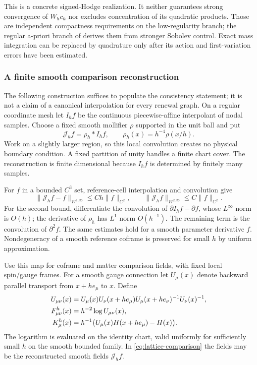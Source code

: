 \documentclass[11pt]{article}
\numberwithin{equation}{section}
\theoremstyle{definition}
\theoremstyle{remark}
\newcommand{\norm}[1]{\lVert#1\rVert}
\begin{document}
This is a concrete signed-Hodge realization. It neither guarantees strong convergence of $W_hc_h$ nor excludes concentration of its quadratic products. Those are independent compactness requirements on the low-regularity branch; the regular a-priori branch of  derives them from stronger Sobolev control. Exact mass integration can be replaced by quadrature only after its action and first-variation errors have been estimated.

\subsubsection{A finite smooth comparison reconstruction}

The following construction suffices to populate the consistency statement; it is not a claim of a canonical interpolation for every renewal graph. On a regular coordinate mesh let $I_hf$ be the continuous piecewise-affine interpolant of nodal samples. Choose a fixed smooth mollifier $\rho$ supported in the unit ball and put
\begin{equation}
 \mathcal J_hf=\rho_h*I_hf,
 \qquad \rho_h(x)=h^{-4}\rho(x/h).
 \label{eq:smooth-reconstruction}
\end{equation}
Work on a slightly larger region, so this local convolution creates no physical boundary condition. A fixed partition of unity handles a finite chart cover. The reconstruction is finite dimensional because $I_hf$ is determined by finitely many samples.

For $f$ in a bounded $C^3$ set, reference-cell interpolation and convolution give
\begin{equation}
 \norm{\mathcal J_hf-f}_{W^{1,\infty}}\le Ch\norm f_{C^2},
 \qquad \norm{\mathcal J_hf}_{W^{2,\infty}}\le C\norm f_{C^2}.
 \label{eq:smooth-reconstruction-estimate}
\end{equation}
For the second bound, differentiate the convolution of $\partial I_hf-\partial f$, whose $L^\infty$ norm is $O(h)$; the derivative of $\rho_h$ has $L^1$ norm $O(h^{-1})$. The remaining term is the convolution of $\partial^2f$. The same estimates hold for a smooth parameter derivative $\dot f$. Nondegeneracy of a smooth reference coframe is preserved for small $h$ by uniform approximation.

Use this map for coframe and matter comparison fields, with fixed local spin/gauge frames. For a smooth gauge connection let $U_\mu(x)$ denote backward parallel transport from $x+h e_\mu$ to $x$. Define
\begin{align}
 U_{\mu\nu}(x)
 &=U_\mu(x)U_\nu(x+h e_\mu)
          U_\mu(x+h e_\nu)^{-1}U_\nu(x)^{-1},\notag\\
 F^h_{\mu\nu}(x)&=h^{-2}\log U_{\mu\nu}(x),\notag\\
 K^h_\mu(x)&=h^{-1}\bigl(U_\mu(x)H(x+h e_\mu)-H(x)\bigr).
 \label{eq:lattice-comparison}
\end{align}
The logarithm is evaluated on the identity chart, valid uniformly for sufficiently small $h$ on the smooth bounded family. In \eqref{eq:lattice-comparison} the fields may be the reconstructed smooth fields $\mathcal J_hf$.
\end{document}
